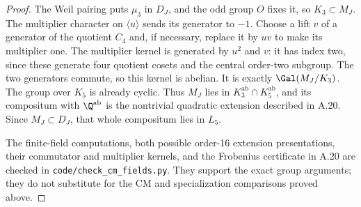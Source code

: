 \begin{proof}
The Weil pairing puts $\mu_3$ in $D_J$, and the odd group $O$
fixes it, so $K_3\subset M_J$. The multiplier character on
$\langle u\rangle$ sends its generator to $-1$. Choose a lift
$v$ of a generator of the quotient $C_4$ and, if necessary,
replace it by $uv$ to make its multiplier one. The multiplier
kernel is generated by $u^2$ and $v$: it has index two, since
these generate four quotient cosets and the central order-two
subgroup. The two generators commute, so this kernel is abelian.
It is exactly $\Gal(M_J/K_3)$. The group over $K_5$ is already
cyclic. Thus $M_J$ lies in $K_3^{\mathrm{ab}}\cap K_5^{\mathrm{ab}}$,
and its compositum with $\Q^{\mathrm{ab}}$ is the nontrivial
quadratic extension described in A.20. Since $M_J\subset D_J$,
that whole compositum lies in $L_5$.

The finite-field computations, both possible order-16 extension
presentations, their commutator and multiplier kernels, and the
Frobenius certificate in A.20 are checked in
\texttt{code/check\_cm\_fields.py}. They support the exact group
arguments; they do not substitute for the CM and specialization
comparisons proved above.
\end{proof}

